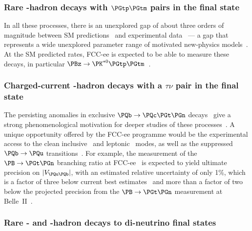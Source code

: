 \subsubsection{Rare \texorpdfstring{\PQb}{b}-hadron decays with \texorpdfstring{$\PGtp\PGtm$}{taubar tau} pairs in the final state} 

In all these processes, there is an unexplored gap of about three orders of magnitude 
between SM predictions~\cite{Bobeth:2013uxa, Bouchard:2013mia, Kamenik:2017ghi} 
and experimental data~\cite{BaBar:2016wgb,LHCb:2017myy} 
--- a gap that represents a wide unexplored parameter range 
of motivated new-physics models~\cite{Buttazzo:2017ixm,Capdevila:2017iqn,Bauer:2021mvw}. 
At the SM predicted rates, FCC-ee is expected to be able to measure these decays, 
in particular $\PBz \to \PK^{*0} \PGtp \PGtm$~\cite{Li:2020bvr, miralles_2024_9t6w9-mmd12}.

\subsubsection{Charged-current \texorpdfstring{\PQb}{b}-hadron decays with a \texorpdfstring{$\tau\nu$}{tau nu} pair in the final state} 

The persisting anomalies in exclusive $\PQb \to \PQc\PGt\PGn$ decays~\cite{HFLAV:2022esi} 
give a strong phenomenological motivation for deeper studies 
of these processes~\cite{Fajfer:2012jt,Alonso:2015sja,Bernlochner:2017jka, Ho:2022ipo}.
A unique opportunity offered by the FCC-ee programme would be the experimental access 
to the clean inclusive~\cite{Ligeti:2014kia,Ligeti:2021six} 
and leptonic~\cite{Amhis:2021cfy, Zheng:2020ult} modes, 
as well as the suppressed $\PQb \to \PQu$ transitions~\cite{Aebischer:2022oqe,Fuentes-Martin:2019mun}.  
For example, the measurement of the \mbox{$\PB \to \PGt \PGn$} branching ratio at FCC-ee~\cite{Zuo:2023dzn} 
is expected to yield ultimate precision on $|V_{\PQu\PQb}|$, 
with an estimated relative uncertainty of only 1\%, 
which is a factor of three below current best estimates~\cite{HFLAV:2022esi} 
and more than a factor of two below the projected precision from the $\PB \to \PGt \PGn$ measurement at Belle~II~\cite{Belle-II:2018jsg}.

\subsubsection{Rare \texorpdfstring{\PQb}{b}- and \texorpdfstring{\PQc}{c}-hadron decays to di-neutrino final states} 

